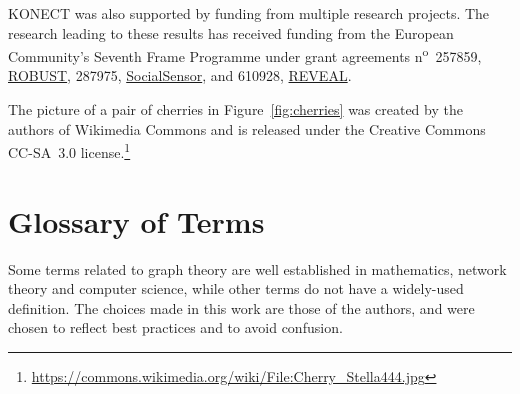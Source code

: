 \documentclass{article}
\begin{document}
KONECT was also supported by funding from multiple research projects. 
The research leading to
these results has received funding from the European Community's Seventh
Frame Programme under grant agreements n\textsuperscript{o}~257859,
\href{http://robust-project.eu/}{ROBUST}, 287975,
\href{http://www.socialsensor.eu/}{SocialSensor}, and 610928,
\href{http://revealproject.eu/}{REVEAL}. 

The picture of a pair of cherries in Figure~\ref{fig:cherries} was
created by the authors of Wikimedia Commons and is released under the
Creative Commons CC-SA~3.0 license.\footnote{\url{https://commons.wikimedia.org/wiki/File:Cherry_Stella444.jpg}}




\appendix

\section{Glossary of Terms}

Some terms related to graph theory are well established in mathematics,
network theory and computer science, while other terms do not have a
widely-used definition.  
The choices made in this work are those of the authors, and were chosen
to reflect best practices and to avoid confusion.
\end{document}
